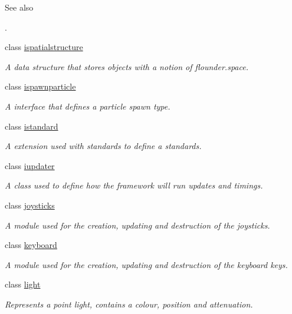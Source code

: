 \begin{DoxyCompactItemize}
\begin{DoxyCompactList}
\begin{DoxySeeAlso}{See also}
\end{DoxySeeAlso}
. \end{DoxyCompactList}\item 
class \hyperlink{classflounder_1_1ispatialstructure}{ispatialstructure}
\begin{DoxyCompactList}\small\item\em A data structure that stores objects with a notion of flounder.\+space. \end{DoxyCompactList}\item 
class \hyperlink{classflounder_1_1ispawnparticle}{ispawnparticle}
\begin{DoxyCompactList}\small\item\em A interface that defines a particle spawn type. \end{DoxyCompactList}\item 
class \hyperlink{classflounder_1_1istandard}{istandard}
\begin{DoxyCompactList}\small\item\em A extension used with standards to define a standards. \end{DoxyCompactList}\item 
class \hyperlink{classflounder_1_1iupdater}{iupdater}
\begin{DoxyCompactList}\small\item\em A class used to define how the framework will run updates and timings. \end{DoxyCompactList}\item 
class \hyperlink{classflounder_1_1joysticks}{joysticks}
\begin{DoxyCompactList}\small\item\em A module used for the creation, updating and destruction of the joysticks. \end{DoxyCompactList}\item 
class \hyperlink{classflounder_1_1keyboard}{keyboard}
\begin{DoxyCompactList}\small\item\em A module used for the creation, updating and destruction of the keyboard keys. \end{DoxyCompactList}\item 
class \hyperlink{classflounder_1_1light}{light}
\begin{DoxyCompactList}\small\item\em Represents a point light, contains a colour, position and attenuation. \end{DoxyCompactList}\item 

\end{DoxyCompactItemize}
